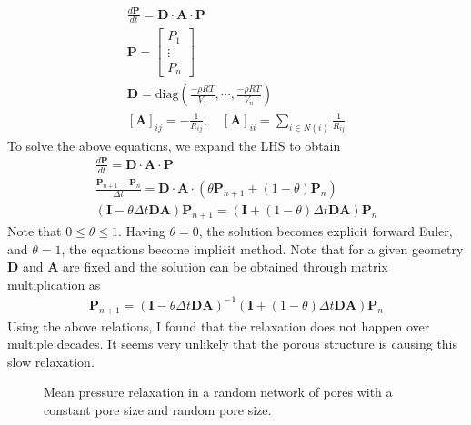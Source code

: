 %
\begin{align}
\frac{d\mathbf{P}}{dt} = \mathbf{D} \cdot \mathbf{A} \cdot \mathbf{P}\\
\mathbf{P} = \begin{bmatrix} P_1 \\ \vdots \\ P_n
\end{bmatrix}\\
\mathbf{D} = \text{diag}(\frac{-\rho R T}{V_1},\cdots, \frac{-\rho R T}{V_n})\\
[\mathbf{A}]_{ij} = -\frac{1}{R_{ij}}, \quad [\mathbf{A}]_{ii} = \sum_{i\in N(i)} \frac{1}{R_{ij}}
\end{align}
%
To solve the above equations, we expand the LHS to obtain
%
\begin{align}
    \frac{d\mathbf{P}}{dt} = \mathbf{D} \cdot \mathbf{A} \cdot \mathbf{P} \\
    \frac{\mathbf{P}_{n+1}- \mathbf{P}_n}{\Delta t} = \mathbf{D} \cdot \mathbf{A} \cdot \left( \theta \mathbf{P}_{n+1} + (1-\theta) \mathbf{P}_{n}\right) \\    
    \left( \mathbf{I} - \theta\Delta t \mathbf{D}\mathbf{A} \right) \mathbf{P}_{n+1} = \left( \mathbf{I} + (1-\theta) \Delta t \mathbf{D} \mathbf{A}\right) \mathbf{P}_n
\end{align}
%
Note that $0 \leq \theta \leq 1$. Having $\theta = 0$, the solution becomes explicit forward Euler, and $\theta = 1$, the equations become implicit method. Note that for a given geometry $\mathbf{D}$ and $\mathbf{A}$ are fixed and the solution can be obtained through matrix multiplication as
%
\begin{align}
 \mathbf{P}_{n+1} = \left( \mathbf{I} - \theta\Delta t \mathbf{D}\mathbf{A} \right)^{-1} \left( \mathbf{I} + (1-\theta) \Delta t \mathbf{D} \mathbf{A}\right) \mathbf{P}_n
\end{align}
%
Using the above relations, I found that the relaxation does not happen over multiple decades. It seems very unlikely that the porous structure is causing this slow relaxation. 
\begin{figure}[H]
  \centering
  \caption{Mean pressure relaxation in a random network of pores with a constant pore size and random pore size.} \label{relaxation}
\end{figure}

